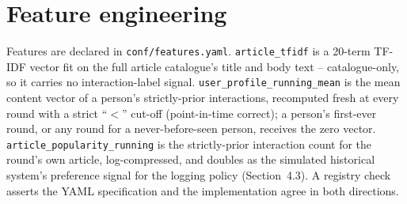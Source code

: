\section{Feature engineering}
Features are declared in \texttt{conf/features.yaml}.
\texttt{article\_tfidf} is a 20-term TF-IDF vector fit on the full article
catalogue's title and body text -- catalogue-only, so it carries no
interaction-label signal. \texttt{user\_profile\_running\_mean} is the mean
content vector of a person's strictly-prior interactions, recomputed fresh
at every round with a strict ``$<$'' cut-off (point-in-time correct); a
person's first-ever round, or any round for a never-before-seen person,
receives the zero vector. \texttt{article\_popularity\_running} is the
strictly-prior interaction count for the round's own article, log-compressed,
and doubles as the simulated historical system's preference signal for the
logging policy (Section~4.3). A registry check asserts the YAML
specification and the implementation agree in both directions.
